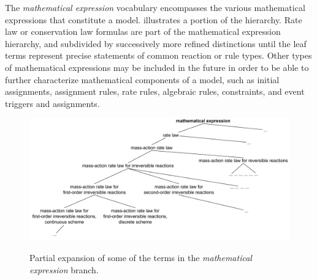 The \emph{mathematical expression} vocabulary encompasses the
various mathematical expressions that constitute a model.
 illustrates a portion of the
hierarchy.  Rate law or conservation law formulas are part of the
mathematical expression hierarchy, and subdivided by successively
more refined distinctions until the leaf terms represent precise
statements of common reaction or rule types.  Other types of
mathematical expressions may be included in the future in order to
be able to further characterize mathematical components of a
model, such as initial assignments, assignment rules, rate rules,
algebraic rules, constraints, and event triggers and assignments.

\begin{figure}[tbh]
  \centering
  \vspace*{-1ex}
             {\includegraphics[scale=0.8, trim=10 0 0 0]{figs/sbo-math-expression-l3v2}}
  \caption{Partial expansion of some of the terms in the \emph{mathematical
      expression} branch.}
  \label{fig:sbo-math-expression}
\end{figure}

